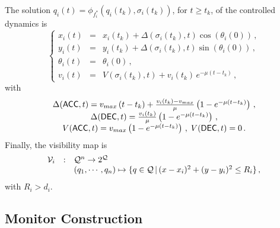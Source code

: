 \documentclass[journal, onecolumn, 12pt]{styles/IEEEtran}
\begin{document}
The solution $q_i(t) = \phi_{f_i^*}(q_i(t_k), \sigma_i(t_k))$, for $t \geq t_k$, of the controlled dynamics is
\begin{equation}
\label{eq:example:solution}
\left\lbrace
\begin{array}{rcl}
x_i(t) & = & x_i(t_k) + \Delta(\sigma_i(t_k), t) \cos \left(\theta_i(0)\right) \, , \\
y_i(t) & = &  y_i(t_k) + \Delta(\sigma_i(t_k), t) \sin \left(\theta_i(0)\right) \, , \\
\theta_i(t)  & = & \theta_i(0) \, , \\
v_i(t) & = & V(\sigma_i(t_k), t) + v_i(t_k) \, e^{-\mu(t-t_k)} \, ,
\end{array}
\right.
\end{equation}
with 
$$
\begin{array}{c}
\Delta(\macc, t) = v_{max} \left( t - t_k \right) + \frac{v_i(t_k)-v_{max}}{\mu} \left( 1-e^{-\mu(t-t_k)} \right) \, , \\
\Delta(\mdec, t) = \frac{v_i(t_k)}{\mu} \left( 1-e^{-\mu(t-t_k)} \right) \, , \\
V(\macc, t) = v_{max} \left( 1-e^{-\mu(t-t_k)} \right) \, , \; V(\mdec, t) = 0 \, .
\end{array}
$$ 
Finally, the visibility map is 
\begin{equation*}
\begin{array}{rcl}
\mathcal{V}_i & : & \mathcal{Q}^n \rightarrow 2^{\mathcal{Q}} \\
& & (q_1, \cdots, q_n) \mapsto \{ q \in \mathcal{Q} \, | \, (x-x_i)^2 + (y-y_i)^2 \leq R_i \}
\, ,
\end{array}
\end{equation*}
with $R_i > d_i$.  

\subsection{Monitor Construction}
\end{document}
